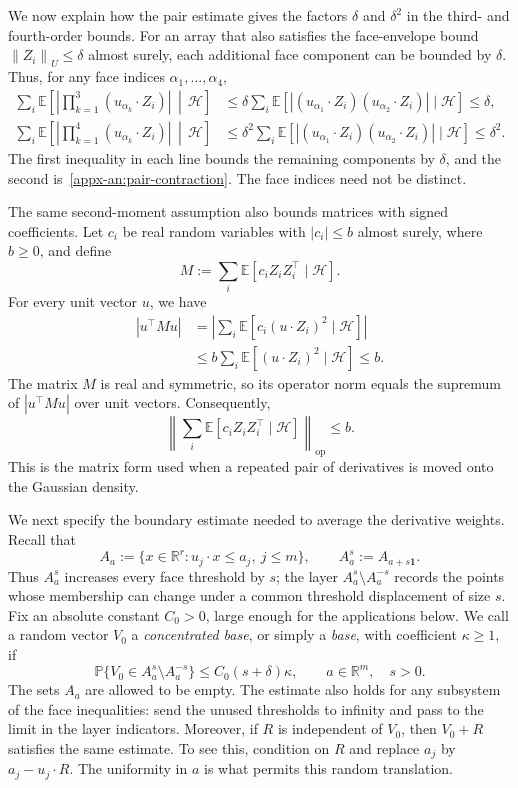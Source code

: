 \documentclass[11pt,letterpaper]{article}
\theoremstyle{remark}
\newcommand{\E}{\mathbb E}
\newcommand{\Pp}{\mathbb P}
\newcommand{\R}{\mathbb R}
\newcommand{\norm}[1]{\left\lVert#1\right\rVert}
\begin{document}
We now explain how the pair estimate gives the factors $\delta$ and
$\delta^2$ in the third- and fourth-order bounds. For an array that
also satisfies the face-envelope bound $\norm{Z_i}_U\le\delta$
almost surely, each additional face component can be bounded by
$\delta$. Thus, for any face indices $\alpha_1,\ldots,\alpha_4$,
\[
 \begin{aligned}
 \sum_i\E\!\left[
   \left|\prod_{k=1}^3(u_{\alpha_k}\cdot Z_i)\right|
   \,\middle|\,\mathcal H\right]
 &\le\delta\sum_i\E[
   |(u_{\alpha_1}\cdot Z_i)(u_{\alpha_2}\cdot Z_i)|
   \mid\mathcal H]\le\delta,\\
 \sum_i\E\!\left[
   \left|\prod_{k=1}^4(u_{\alpha_k}\cdot Z_i)\right|
   \,\middle|\,\mathcal H\right]
 &\le\delta^2\sum_i\E[
   |(u_{\alpha_1}\cdot Z_i)(u_{\alpha_2}\cdot Z_i)|
   \mid\mathcal H]\le\delta^2.
 \end{aligned}
\]
The first inequality in each line bounds the remaining components
by $\delta$, and the second is~\eqref{appx-an:pair-contraction}.
The face indices need not be distinct.

The same second-moment assumption also bounds matrices with signed
coefficients. Let $c_i$ be real random variables with $|c_i|\le b$
almost surely, where $b\ge0$, and define
\[
 M:=\sum_i\E[c_iZ_iZ_i^\top\mid\mathcal H].
\]
For every unit vector $u$, we have
\[
 \begin{aligned}
 |u^\top Mu|
 &=\left|\sum_i\E[c_i(u\cdot Z_i)^2\mid\mathcal H]\right|\\
 &\le b\sum_i\E[(u\cdot Z_i)^2\mid\mathcal H]\le b.
 \end{aligned}
\]
The matrix $M$ is real and symmetric, so its operator norm equals
the supremum of $|u^\top Mu|$ over unit vectors. Consequently,
\[
 \left\|\sum_i\E[c_iZ_iZ_i^\top\mid\mathcal H]\right\|_{\mathrm{op}}
 \le b.
\]
This is the matrix form used when a repeated pair of derivatives
is moved onto the Gaussian density.

We next specify the boundary estimate needed to average the
derivative weights. Recall that
\[
 A_a:=\{x\in\R^r:u_j\cdot x\le a_j,\ j\le m\},
 \qquad A_a^s:=A_{a+s\mathbf1}.
\]
Thus \(A_a^s\) increases every face threshold by \(s\); the layer
\(A_a^s\setminus A_a^{-s}\) records the points whose membership can
change under a common threshold displacement of size \(s\).
Fix an absolute constant \(C_0>0\), large enough for the applications
below. We call a random vector \(V_0\) a \emph{concentrated base},
or simply a \emph{base}, with coefficient \(\kappa\ge1\), if
\begin{equation}
 \Pp\{V_0\in A_a^s\setminus A_a^{-s}\}
 \le C_0(s+\delta)\kappa,
 \qquad a\in\R^m,\quad s>0.
 \label{appx-an:concentration}
\end{equation}
The sets \(A_a\) are allowed to be empty. The estimate also holds
for any subsystem of the face inequalities: send the unused
thresholds to infinity and pass to the limit in the layer
indicators. Moreover, if \(R\) is independent of \(V_0\), then
\(V_0+R\) satisfies the same estimate. To see this, condition on
\(R\) and replace \(a_j\) by \(a_j-u_j\cdot R\). The uniformity
in \(a\) is what permits this random translation.
\end{document}
